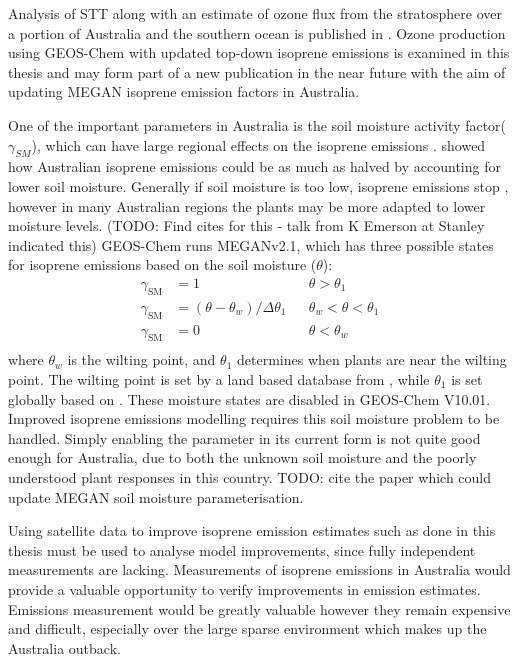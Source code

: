   Analysis of STT along with an estimate of ozone flux from the stratosphere over a portion of Australia and the southern ocean is published in \textcite{Greenslade2017}.
  Ozone production using GEOS-Chem with updated top-down isoprene emissions is examined in this thesis and may form part of a new publication in the near future with the aim of updating MEGAN isoprene emission factors in Australia.
  
  One of the important parameters in Australia is the soil moisture activity factor($\gamma_{SM}$), which can have large regional effects on the isoprene emissions \parencite{Sindelarova2014,Bauwens2016}.
  \textcite{Sindelarova2014} showed how Australian isoprene emissions could be as much as halved by accounting for lower soil moisture.
  Generally if soil moisture is too low, isoprene emissions stop \parencite{Pegoraro2004,Niinemets2010}, however in many Australian regions the plants may be more adapted to lower moisture levels. (TODO: Find cites for this - talk from K Emerson at Stanley indicated this)
  GEOS-Chem runs MEGANv2.1, which has three possible states for isoprene emissions based on the soil moisture ($\theta$):
  \begin{align*}
  \gamma_\mathrm{SM} & = 1 && \theta > \theta_1 \\
  \gamma_\mathrm{SM} & = (\theta-\theta_w)/\Delta\theta_1  && \theta_w < \theta < \theta_1 \\
  \gamma_\mathrm{SM} & = 0 && \theta < \theta_w \\
  \end{align*}
  where $\theta_w$ is the wilting point, and $\theta_1$ determines when plants are near the wilting point.
  The wilting point is set by a land based database from \textcite{Chen2001}, while $\theta_1$ is set globally based on \textcite{Pegoraro2004}.
  These moisture states are disabled in GEOS-Chem V10.01.
  Improved isoprene emissions modelling requires this soil moisture problem to be handled.
  Simply enabling the parameter in its current form is not quite good enough for Australia, due to both the unknown soil moisture and the poorly understood plant responses in this country.
  TODO: cite the paper which could update MEGAN soil moisture parameterisation.
  
  Using satellite data to improve isoprene emission estimates such as done in this thesis must be used to analyse model improvements, since fully independent measurements are lacking.
  Measurements of isoprene emissions in Australia would provide a valuable opportunity to verify improvements in emission estimates.
  Emissions measurement would be greatly valuable however they remain expensive and difficult, especially over the large sparse environment which makes up the Australia outback.
